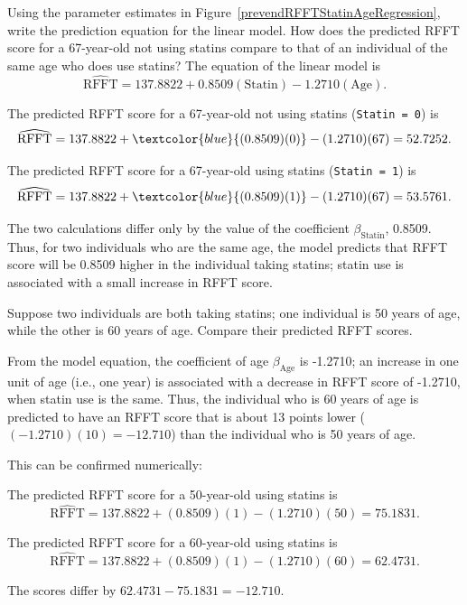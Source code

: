 \begin{examplewrap}
\begin{nexample}{Using the parameter estimates in Figure~\ref{prevendRFFTStatinAgeRegression}, write the prediction equation for the linear model. How does the predicted RFFT score for a 67-year-old not using statins compare to that of an individual of the same age who does use statins?}\label{prevendRFFTStatinAgeExample}%
The equation of the linear model is
\[\widehat{\text{RFFT}} = 137.8822 + 0.8509(\text{Statin}) - 1.2710(\text{Age}). \]	

The predicted RFFT score for a 67-year-old not using statins (\texttt{Statin = 0}) is
\[\widehat{\text{RFFT}} = 137.8822 + \textcolor{blue}{(0.8509)(0)} - (1.2710)(67) = 52.7252. \]

The predicted RFFT score for a 67-year-old using statins (\texttt{Statin = 1}) is
\[\widehat{\text{RFFT}} = 137.8822 + \textcolor{blue}{(0.8509)(1)} - (1.2710)(67) = 53.5761. \]

The two calculations differ only by the value of the coefficient $\beta_{\text{Statin}}$, 0.8509.\footnotemark{} Thus, for two individuals who are the same age, the model predicts that RFFT score will be 0.8509 higher in the individual taking statins; statin use is associated with a small increase in RFFT score.
\end{nexample}
\end{examplewrap}


\begin{examplewrap}
\begin{nexample}{Suppose two individuals are both taking statins; one individual is 50 years of age, while the other is 60 years of age. Compare their predicted RFFT scores.} 

From the model equation, the coefficient of age $\beta_{\text{Age}}$ is -1.2710; an increase in one unit of age (i.e., one year) is associated with a decrease in RFFT score of -1.2710, when statin use is the same. Thus, the individual who is 60 years of age is predicted to have an RFFT score that is about 13 points lower ($(-1.2710)(10) = -12.710$) than the individual who is 50 years of age. 

This can be confirmed numerically:

The predicted RFFT score for a 50-year-old using statins is
\[\widehat{\text{RFFT}} = 137.8822 + (0.8509)(1) - (1.2710)(50) = 75.1831. \]

The predicted RFFT score for a 60-year-old using statins is
\[\widehat{\text{RFFT}} = 137.8822 + (0.8509)(1) - (1.2710)(60) = 62.4731. \]

The scores differ by $62.4731 - 75.1831 = - 12.710.$
\end{nexample}
\end{examplewrap}

